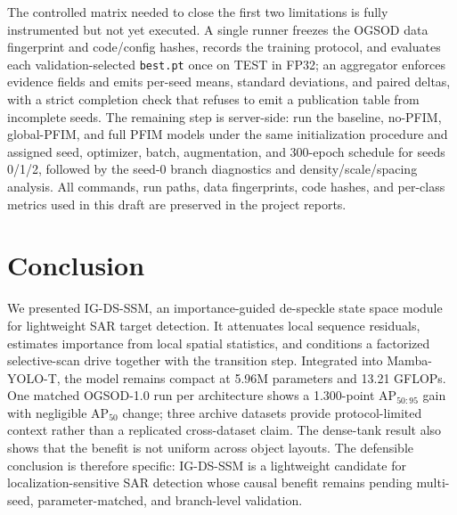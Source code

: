 \documentclass[letterpaper]{article}
\newcommand{\method}{IG-DS-SSM}
\begin{document}
The controlled matrix needed to close the first two limitations is fully instrumented but not yet executed. A single runner freezes the OGSOD data fingerprint and code/config hashes, records the training protocol, and evaluates each validation-selected \texttt{best.pt} once on TEST in FP32; an aggregator enforces evidence fields and emits per-seed means, standard deviations, and paired deltas, with a strict completion check that refuses to emit a publication table from incomplete seeds. The remaining step is server-side: run the baseline, no-PFIM, global-PFIM, and full PFIM models under the same initialization procedure and assigned seed, optimizer, batch, augmentation, and 300-epoch schedule for seeds 0/1/2, followed by the seed-0 branch diagnostics and density/scale/spacing analysis. All commands, run paths, data fingerprints, code hashes, and per-class metrics used in this draft are preserved in the project reports.

\section{Conclusion}

We presented \method, an importance-guided de-speckle state space module for lightweight SAR target detection. It attenuates local sequence residuals, estimates importance from local spatial statistics, and conditions a factorized selective-scan drive together with the transition step. Integrated into Mamba-YOLO-T, the model remains compact at 5.96M parameters and 13.21 GFLOPs. One matched OGSOD-1.0 run per architecture shows a 1.300-point AP$_{50:95}$ gain with negligible AP$_{50}$ change; three archive datasets provide protocol-limited context rather than a replicated cross-dataset claim. The dense-tank result also shows that the benefit is not uniform across object layouts. The defensible conclusion is therefore specific: \method{} is a lightweight candidate for localization-sensitive SAR detection whose causal benefit remains pending multi-seed, parameter-matched, and branch-level validation.



\end{document}
